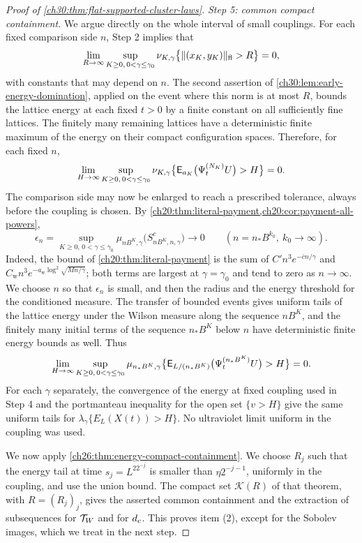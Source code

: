 \begin{proof}[Proof of \cref{ch30:thm:flat-supported-cluster-laws}]
\emph{Step 5: common compact containment.} We argue directly on the whole interval of small couplings. For each fixed comparison side $n$, Step 2 implies that
\[
 \lim_{R\to\infty}\sup_{K\ge0,\,0<\gamma\le\gamma_0}\nu_{K,\gamma}\bigl\{\lVert (x_K,y_K)\rVert_{\mathrm{fl}}>R\bigr\}=0,
\]
with constants that may depend on $n$. The second assertion of \cref{ch30:lem:early-energy-domination}, applied on the event where this norm is at most $R$, bounds the lattice energy at each fixed $t>0$ by a finite constant on all sufficiently fine lattices. The finitely many remaining lattices have a deterministic finite maximum of the energy on their compact configuration spaces. Therefore, for each fixed $n$,
\[
 \lim_{H\to\infty}\sup_{K\ge0,\,0<\gamma\le\gamma_0}\nu_{K,\gamma}\bigl\{\mathsf E_{a_K}\bigl(\Psi^{(N_K)}_tU\bigr)>H\bigr\}=0 .
\]
The comparison side may now be enlarged to reach a prescribed tolerance, always before the coupling is chosen. By \cref{ch20:thm:literal-payment,ch20:cor:payment-all-powers},
\[
 \epsilon_n=\sup_{K\ge0,\,0<\gamma\le\gamma_0}\mu_{nB^K,\gamma}\bigl(S_{nB^K,n,\gamma}^c\bigr)\longrightarrow0\qquad(n=n_*B^{k_0},\ k_0\to\infty).
\]
Indeed, the bound of \cref{ch20:thm:literal-payment} is the sum of $C'n^3e^{-\bar cn/\gamma}$ and $C_{\mathrm w}n^3e^{-a_{\mathrm w}\log^2\sqrt{Mn/\gamma}}$; both terms are largest at $\gamma=\gamma_0$ and tend to zero as $n\to\infty$. We choose $n$ so that $\epsilon_n$ is small, and then the radius and the energy threshold for the conditioned measure. The transfer of bounded events gives uniform tails of the lattice energy under the Wilson measure along the sequence $nB^K$, and the finitely many initial terms of the sequence $n_*B^K$ below $n$ have deterministic finite energy bounds as well. Thus
\[
 \lim_{H\to\infty}\sup_{K\ge0,\,0<\gamma\le\gamma_0}\mu_{n_*B^K,\gamma}\bigl\{\mathsf E_{L/(n_*B^K)}\bigl(\Psi^{(n_*B^K)}_tU\bigr)>H\bigr\}=0 .
\]
For each $\gamma$ separately, the convergence of the energy at fixed coupling used in Step 4 and the portmanteau inequality for the open set $\{v>H\}$ give the same uniform tails for $\lambda_\gamma\{E_L(X(t))>H\}$. No ultraviolet limit uniform in the coupling was used.

We now apply \cref{ch26:thm:energy-compact-containment}. We choose $R_j$ such that the energy tail at time $s_j=L^22^{-j}$ is smaller than $\eta2^{-j-1}$, uniformly in the coupling, and use the union bound. The compact set $\mathcal K(R)$ of that theorem, with $R=(R_j)_j$, gives the asserted common containment and the extraction of subsequences for $\mathcal T_W$ and for $d_c$. This proves item (2), except for the Sobolev images, which we treat in the next step.


\end{proof}
